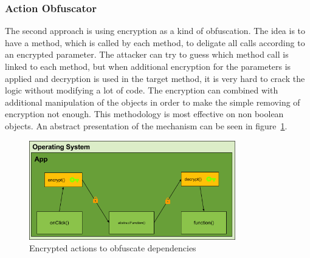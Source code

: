 \subsubsection{Action Obfuscator} \label{subsubsectionection:counter-replace-encryption-content-obfuscator}
The second approach is using encryption as a kind of obfuscation.
The idea is to have a method, which is called by each method, to deligate all calls according to an encrypted parameter.
The attacker can try to guess which method call is linked to each method, but when additional encryption for the parameters is applied and decryption is used in the target method, it is very hard to crack the logic without modifying a lot of code.
The encryption can combined with additional manipulation of the objects in order to make the simple removing of encryption not enough.
This methodology is most effective on non boolean objects.
An abstract presentation of the mechanism can be seen in figure~\ref{fig:encryptionAction}.

\begin{figure}[h]
    \centering
    \includegraphics[width=0.8\textwidth]{data/encryptionAction.png}
    \caption{Encrypted actions to obfuscate dependencies}
    \label{fig:encryptionAction}
\end{figure}
